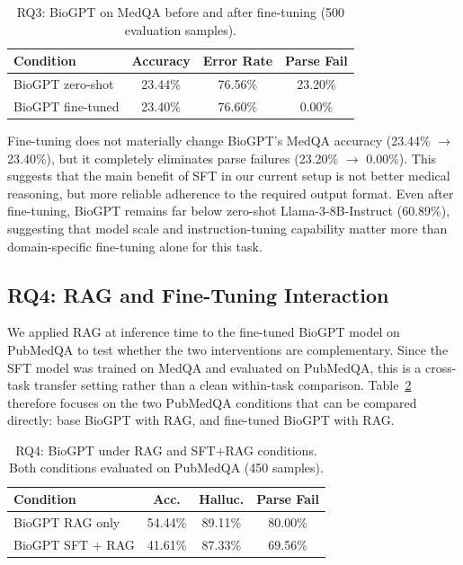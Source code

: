 \documentclass[11pt]{article}
\begin{document}
\begin{table}[h!]
  \centering
  \small
  \begin{tabular}{lccc}
    \toprule
    \textbf{Condition} & \textbf{Accuracy} & \textbf{Error Rate} & \textbf{Parse Fail} \\
    \midrule
    BioGPT zero-shot   & 23.44\% & 76.56\% & 23.20\% \\
    BioGPT fine-tuned  & 23.40\% & 76.60\% &  0.00\% \\
    \bottomrule
  \end{tabular}
  \caption{RQ3: BioGPT on MedQA before and after fine-tuning 
  (500 evaluation samples).}
  \label{tab:rq3}
\end{table}

Fine-tuning does not materially change BioGPT's MedQA accuracy 
(23.44\% $\rightarrow$ 23.40\%), but it completely eliminates parse 
failures (23.20\% $\rightarrow$ 0.00\%). This suggests that the main 
benefit of SFT in our current setup is not better medical reasoning, but 
more reliable adherence to the required output format. Even after 
fine-tuning, BioGPT remains far below zero-shot Llama-3-8B-Instruct 
(60.89\%), suggesting that model scale and instruction-tuning capability 
matter more than domain-specific fine-tuning alone for this task.

\subsection{RQ4: RAG and Fine-Tuning Interaction}
 
We applied RAG at inference time to the fine-tuned BioGPT model on 
PubMedQA to test whether the two interventions are complementary. Since 
the SFT model was trained on MedQA and evaluated on PubMedQA, this is a 
cross-task transfer setting rather than a clean within-task comparison. 
Table~\ref{tab:rq4} therefore focuses on the two PubMedQA conditions 
that can be compared directly: base BioGPT with RAG, and fine-tuned 
BioGPT with RAG.
 
\begin{table}[h!]
  \centering
  \small
  \begin{tabular}{lccc}
    \toprule
    \textbf{Condition} & \textbf{Acc.} & \textbf{Halluc.} & \textbf{Parse Fail} \\
    \midrule
    BioGPT RAG only    & 54.44\% & 89.11\% & 80.00\% \\
    BioGPT SFT + RAG   & 41.61\% & 87.33\% & 69.56\% \\
    \bottomrule
  \end{tabular}
  \caption{RQ4: BioGPT under RAG and SFT+RAG conditions. 
  Both conditions evaluated on PubMedQA (450 samples).}
  \label{tab:rq4}
\end{table}
 
\end{document}
